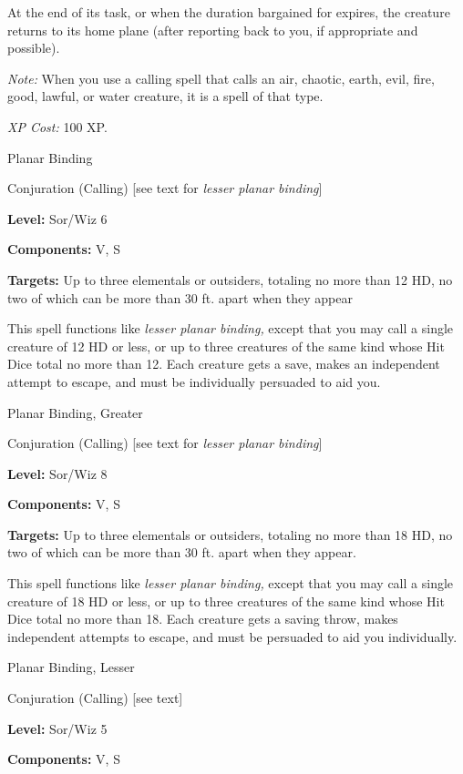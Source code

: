 \documentclass{article}
\begin{document}
At the end of its task, or when the duration bargained for expires, the creature 
returns to its home plane (after reporting back to you, if appropriate and possible).

\textit{Note: }When you use a calling spell that calls an air, chaotic, earth, 
evil, fire, good, lawful, or water creature, it is a spell of that type.

\textit{XP Cost: }100 XP.

\vspace{12pt}
Planar Binding

Conjuration (Calling) [see text for \textit{lesser planar binding}]

\textbf{Level:} Sor/Wiz 6

\textbf{Components:} V, S

\textbf{Targets:} Up to three elementals or outsiders, totaling no more than 12 
HD, no two of which can be more than 30 ft. apart when they appear

This spell functions like \textit{lesser planar binding, }except that you may call 
a single creature of 12 HD or less, or up to three creatures of the same kind whose 
Hit Dice total no more than 12. Each creature gets a save, makes an independent 
attempt to escape, and must be individually persuaded to aid you.

\vspace{12pt}
Planar Binding, Greater

Conjuration (Calling) [see text for \textit{lesser planar binding}]

\textbf{Level:} Sor/Wiz 8

\textbf{Components:} V, S

\textbf{Targets:} Up to three elementals or outsiders, totaling no more than 18 
HD, no two of which can be more than 30 ft. apart when they appear.

This spell functions like \textit{lesser planar binding, }except that you may call 
a single creature of 18 HD or less, or up to three creatures of the same kind whose 
Hit Dice total no more than 18. Each creature gets a saving throw, makes independent 
attempts to escape, and must be persuaded to aid you individually.

\vspace{12pt}
Planar Binding, Lesser

Conjuration (Calling) [see text]

\textbf{Level:} Sor/Wiz 5

\textbf{Components:} V, S
\end{document}
